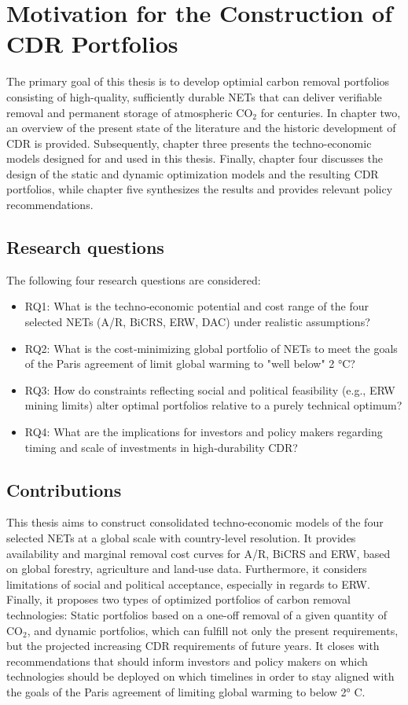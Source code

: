 \section{Motivation for the Construction of CDR Portfolios}
The primary goal of this thesis is to develop optimial carbon removal portfolios consisting of high-quality, sufficiently durable NETs that can deliver verifiable removal and permanent storage of atmospheric CO$_2$ for centuries. In chapter two, an overview of the present state of the literature and the historic development of CDR is provided. Subsequently, chapter three presents the techno-economic models designed for and used in this thesis. Finally, chapter four discusses the design of the static and dynamic optimization models and the resulting CDR portfolios, while chapter five synthesizes the results and provides relevant policy recommendations.\vspace{2mm}

\subsection{Research questions}
The following four research questions are considered:
\begin{itemize}
  \item RQ1: What is the techno‑economic potential and cost range of the four selected NETs (A/R, BiCRS, ERW, DAC) under realistic assumptions?
  \item RQ2: What is the cost‑minimizing global portfolio of NETs to meet the goals of the Paris agreement of limit global warming to "well below" 2 °C?
  \item RQ3: How do constraints reflecting social and political feasibility (e.g., ERW mining limits) alter optimal portfolios relative to a purely technical optimum?
  \item RQ4: What are the implications for investors and policy makers regarding timing and scale of investments in high‑durability CDR?
\end{itemize}

\subsection{Contributions}
This thesis aims to construct consolidated techno-economic models of the four selected NETs at a global scale with country-level resolution. It provides availability and marginal removal cost curves for A/R, BiCRS and ERW, based on global forestry, agriculture and land-use data. Furthermore, it considers limitations of social and political acceptance, especially in regards to ERW. Finally, it proposes two types of optimized portfolios of carbon removal technologies: Static portfolios based on a one-off removal of a given quantity of CO$_2$, and dynamic portfolios, which can fulfill not only the present requirements, but the projected increasing CDR requirements of future years. It closes with recommendations that should inform investors and policy makers on which technologies should be deployed on which timelines in order to stay aligned with the goals of the Paris agreement of limiting global warming to below 2° C.